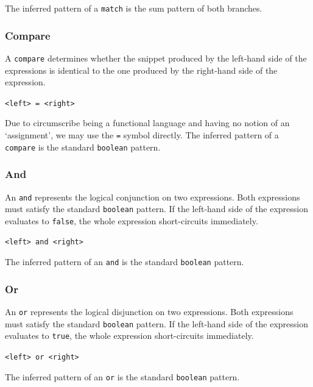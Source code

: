 \documentclass{article}
\begin{document}
The inferred pattern of a \texttt{match} is the sum pattern of both branches.

\subsubsection{Compare}

A \texttt{compare} determines whether the snippet produced by the left-hand side of the expressions
is identical to the one produced by the right-hand side of the expression.

\begin{center}
    \verb|<left> = <right>|
\end{center}

Due to circumscribe being a functional language and having no notion of an `assignment',
we may use the \texttt{=} symbol directly. The inferred pattern of a \texttt{compare} is the
standard \texttt{boolean} pattern.

\subsubsection{And}

An \texttt{and} represents the logical conjunction on two expressions. Both expressions must
satisfy the standard \texttt{boolean} pattern. If the left-hand side of the expression
evaluates to \texttt{false}, the whole expression short-circuits immediately.

\begin{center}
    \verb|<left> and <right>|
\end{center}

The inferred pattern of an \texttt{and} is the standard \texttt{boolean} pattern.

\subsubsection{Or}

An \texttt{or} represents the logical disjunction on two expressions. Both expressions must
satisfy the standard \texttt{boolean} pattern. If the left-hand side of the expression
evaluates to \texttt{true}, the whole expression short-circuits immediately.

\begin{center}
    \verb|<left> or <right>|
\end{center}

The inferred pattern of an \texttt{or} is the standard \texttt{boolean} pattern.
\end{document}
